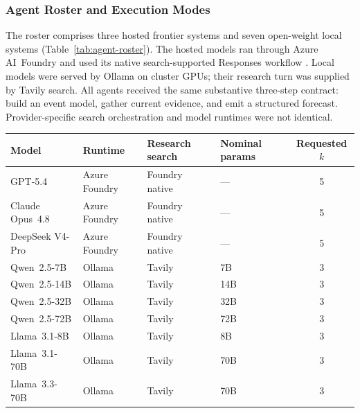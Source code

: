 \subsubsection{Agent Roster and Execution Modes}
\label{app:agent-roster}

The roster comprises three hosted frontier systems and seven open-weight local systems
(Table~\ref{tab:agent-roster}).  The hosted models ran through Azure AI~Foundry and used
its native search-supported Responses workflow \citep{microsoft2026foundry}.  Local
models were served by Ollama \citep{ollama2026} on cluster GPUs; their research turn was supplied by Tavily search.  All agents received the same substantive three-step contract: build an event
model, gather current evidence, and emit a structured forecast. Provider-specific
search orchestration and model runtimes were not identical.

\begin{center}
\begin{minipage}{\linewidth}
\centering
{}
\label{tab:agent-roster}
\small
\begin{tabular}{llllc}
\toprule
\textbf{Model} & \textbf{Runtime} & \textbf{Research search} &
\textbf{Nominal params} & \textbf{Requested $k$} \\
\midrule
GPT-5.4          & Azure Foundry & Foundry native & --- & 5 \\
Claude Opus~4.8  & Azure Foundry & Foundry native & --- & 5 \\
DeepSeek V4-Pro  & Azure Foundry & Foundry native & --- & 5 \\
Qwen~2.5-7B      & Ollama & Tavily & 7B  & 3 \\
Qwen~2.5-14B     & Ollama & Tavily & 14B & 3 \\
Qwen~2.5-32B     & Ollama & Tavily & 32B & 3 \\
Qwen~2.5-72B     & Ollama & Tavily & 72B & 3 \\
Llama~3.1-8B     & Ollama & Tavily & 8B  & 3 \\
Llama~3.1-70B    & Ollama & Tavily & 70B & 3 \\
Llama~3.3-70B    & Ollama & Tavily & 70B & 3 \\
\bottomrule
\end{tabular}
\end{minipage}
\end{center}

